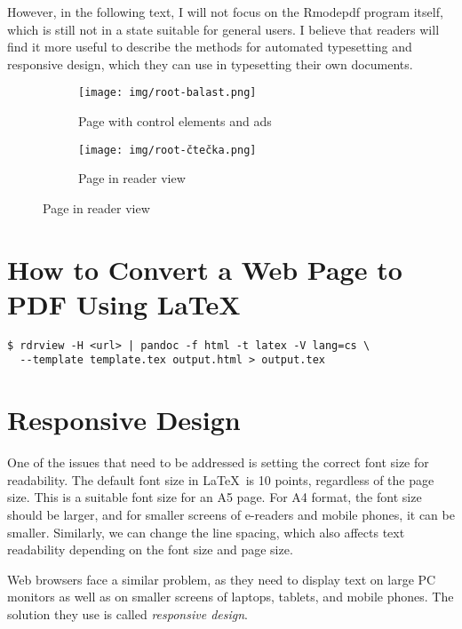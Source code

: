 \documentclass{ltugboat}
\newcommand\program[1]{#1}
\begin{document}
However, in the following text, I will not focus on the \program{Rmodepdf} program itself, which is still not in a state suitable for general users. I believe that readers will find it more useful to describe the methods for automated typesetting and responsive design, which they can use in typesetting their own documents.

\begin{figure}[tbp]
  \centering
  \caption{Example of using the \emph{reader view} mode in the \program{Firefox} browser}
  \label{fig:readermode}
  \begin{subfigure}[t]{0.45\textwidth}
    \texttt{[image: img/root-balast.png]}
    \caption{Page with control elements and ads}
  \end{subfigure}
  \hfill
  \begin{subfigure}[t]{0.45\textwidth}
    \texttt{[image: img/root-čtečka.png]}
    \caption{Page in reader view}
  \end{subfigure}
\end{figure}

\section{How to Convert a Web Page to PDF Using \LaTeX}


\begin{verbatim}
$ rdrview -H <url> | pandoc -f html -t latex -V lang=cs \
  --template template.tex output.html > output.tex
\end{verbatim}


\section{Responsive Design}

One of the issues that need to be addressed is setting the correct font size for readability. The default font size in \LaTeX\ is 10 points, regardless of the page size. This is a suitable font size for an A5 page. For A4 format, the font size should be larger, and for smaller screens of e-readers and mobile phones, it can be smaller. Similarly, we can change the line spacing, which also affects text readability depending on the font size and page size.

Web browsers face a similar problem, as they need to display text on large PC monitors as well as on smaller screens of laptops, tablets, and mobile phones. The solution they use is called \textit{responsive design}.
\end{document}
